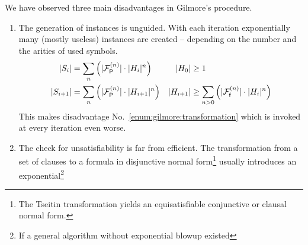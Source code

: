 We have observed three main disadvantages in Gilmore's procedure.
\begin{enumerate}
	\item\label{enum:gilmore:generation}
	 The generation of instances is unguided. 
	With each iteration exponentially many (mostly useless)
	instances are created
	-- depending on the number and the arities of used symbols.
\begin{align*}
	\lvert S_{i} \rvert &= \sum_n \left( \lvert {{\mathcal F}^{(n)}_{\mathsf P}} \rvert\cdot \lvert H_{i}\rvert^n \right)
	&
	\lvert H_0 \rvert &\geq 1	
	\\
	\lvert S_{i+1} \rvert &= \sum_n \left( \lvert {{\mathcal F}^{(n)}_{\mathsf P}} \rvert\cdot \lvert H_{i+1}\rvert^n \right)
	&
	\lvert H_{i+1}\rvert &\geq 
	\sum_{n>0}\left(
	\lvert{{\mathcal F}^{(n)}_{\mathsf f}}\rvert\cdot\lvert H_i \rvert^n
	\right) 
\end{align*}
		This makes disadvantage No.~\ref{enum:gilmore:transformation} 
		which is invoked at every iteration even worse.
	\item\label{enum:gilmore:transformation} 
	The check for unsatisfiability is far from efficient.
	The transformation from a set of clauses 
	to a formula in disjunctive normal form\footnote{
		The Tseitin transformation yields an equisatisfiable conjunctive or clausal normal form.
	}
	usually introduces an exponential\footnote{
		If a general algorithm without exponential blowup existed 
}
\end{enumerate}
